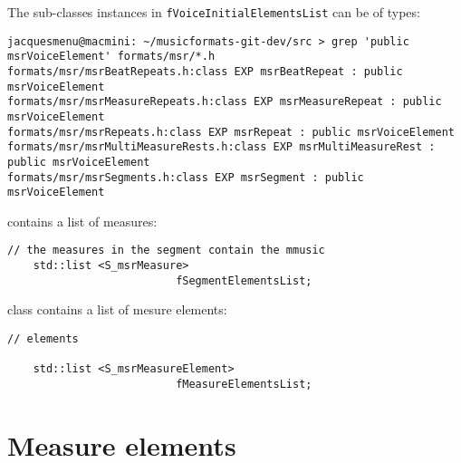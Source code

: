 The  sub-classes instances in {\tt fVoiceInitialElementsList} can be of types:
\begin{lstlisting}[language=Terminal]
jacquesmenu@macmini: ~/musicformats-git-dev/src > grep 'public msrVoiceElement' formats/msr/*.h
formats/msr/msrBeatRepeats.h:class EXP msrBeatRepeat : public msrVoiceElement
formats/msr/msrMeasureRepeats.h:class EXP msrMeasureRepeat : public msrVoiceElement
formats/msr/msrRepeats.h:class EXP msrRepeat : public msrVoiceElement
formats/msr/msrMultiMeasureRests.h:class EXP msrMultiMeasureRest : public msrVoiceElement
formats/msr/msrSegments.h:class EXP msrSegment : public msrVoiceElement
\end{lstlisting}

 contains a list of measures:
\begin{lstlisting}[language=CPlusPlus]
    // the measures in the segment contain the mmusic
    std::list <S_msrMeasure>
                          fSegmentElementsList;
\end{lstlisting}

class   {\tt } contains a list of mesure elements:
\begin{lstlisting}[language=CPlusPlus]
    // elements

    std::list <S_msrMeasureElement>
                          fMeasureElementsList;
\end{lstlisting}


\section{Measure elements}

